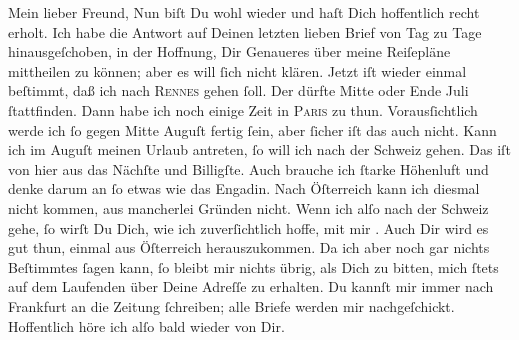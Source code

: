 \pstart\center{}Mein lieber Freund,\pend\vspace{0.5em}
\pstart
           Nun biſt Du wohl wieder \label{K_L02878-1v}\label{K_L02878-1} und haſt Dich hoffentlich recht erholt. Ich habe die Antwort auf
               Deinen letzten lieben Brief von Tag zu Tage hinausgeſchoben, in der Hoffnung, Dir
               Genaueres über meine Reiſepläne mittheilen zu können; aber es will ſich nicht klären.
               Jetzt iſt wieder einmal beſtimmt, daß ich nach \textsc{Rennes} gehen ſoll. Der \label{K_L02878-2v}\label{K_L02878-2} dürfte Mitte oder Ende Juli ſtattfinden. Dann habe ich noch einige Zeit in \textsc{Paris} zu thun. Vorausſichtlich werde ich ſo gegen Mitte Auguſt fertig ſein, aber ſicher iſt das auch nicht. {\pb}Kann ich im Auguſt
               meinen Urlaub antreten, ſo will ich nach der Schweiz gehen. Das iſt von hier aus das Nächſte und Billigſte. Auch brauche
               ich ſtarke Höhenluft und denke darum an ſo etwas wie das Engadin. Nach Öſterreich
               kann ich diesmal nicht kommen, aus mancherlei Gründen nicht. Wenn ich alſo nach der
                  Schweiz gehe, ſo wirſt Du Dich, wie ich
               zuverſichtlich hoffe, mit mir \label{K_L02878-3v}\label{K_L02878-3}.
               Auch Dir wird es gut thun, einmal aus Öſterreich herauszukommen. Da ich aber noch gar nichts Beſtimmtes ſagen
               kann, ſo bleibt mir nichts übrig, als Dich zu bitten, mich ſtets auf dem Laufenden
               über Deine Adreſſe zu erhalten. Du kannſt mir immer nach Frankfurt an die Zeitung ſchreiben; alle Briefe werden mir nachgeſchickt. {\pb}Hoffentlich höre ich alſo bald wieder von Dir.\pend
           
